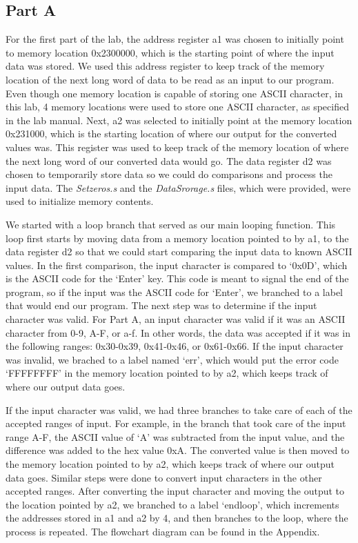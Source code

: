 \documentclass[letterpaper]{article}
\begin{document}
  \subsection{Part A}
    For the first part of the lab, the address register a1 was chosen to initially point to
    memory location 0x2300000, which is the starting point of where the input data was stored.
    We used this address register to keep track of the memory location of the next long word
    of data to be read as an input to our program. Even though one memory location is capable
    of storing one ASCII character, in this lab, 4 memory locations were used to store one
    ASCII character, as specified in the lab manual.
    Next, a2 was selected to initially point at the memory location 0x231000, which is the
    starting location of where our output for the converted values was. This register
    was used to keep track of the memory location of where the next long word of
    our converted data would go. The data register d2 was chosen to temporarily store
    data so we could do comparisons and process the input data.
    The \textit{Setzeros.s} and the \textit{DataSrorage.s}
    files, which were provided, were used to initialize memory contents.

    We started with a loop branch that served as our main looping function. This
    loop first starts by moving data from a memory location pointed to by a1, to
    the data register d2 so that we could start comparing the input data to known ASCII values.
    In the first comparison, the input character is compared to `0x0D', which is the ASCII
    code for the `Enter' key. This code is meant to signal the end of the program, so if
    the input was the ASCII code for `Enter', we branched to a label that
    would end our program. The next step was to determine if the input character was valid.
    For Part A, an input character was valid if it was an ASCII character from 0-9, A-F, or a-f.
    In other words, the data was accepted if it was in the following ranges: 0x30-0x39,
    0x41-0x46, or 0x61-0x66. If the input character was invalid, we brached to a label
    named `err', which would put the error code `FFFFFFFF' in the memory location
    pointed to by a2, which keeps track of where our output data goes.

    If the input character was valid, we had three branches to take care of each
    of the accepted ranges of input. For example, in the branch that took care of the
    input range A-F, the ASCII value of `A' was subtracted from the input value, and
    the difference was added to the hex value 0xA. The converted value is then moved
    to the memory location pointed to by a2, which keeps track of where our output data goes.
    Similar steps were done to convert input characters in the other accepted ranges.
    After converting the input character and moving the output to the location pointed by a2,
    we branched to a label `endloop', which increments the addresses stored in a1 and a2 by 4,
    and then branches to the loop, where the process is repeated. The flowchart diagram can
    be found in the Appendix.
\end{document}
